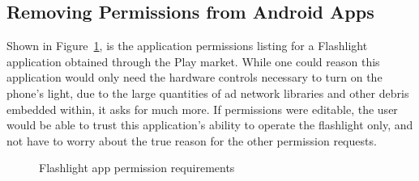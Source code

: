 \subsection{Removing Permissions from Android Apps}

Shown in Figure~\ref{fig:permission}, is the application permissions listing for a Flashlight application obtained through the Play market.  While one could reason this application would only need the hardware controls necessary to turn on the phone's light, due to the large quantities of ad network libraries and other debris embedded within, it asks for much more. If permissions were editable, the user would be able to trust this application’s ability to operate the flashlight only, and not have to worry about the true reason for the other permission requests.

\begin{figure}[t]
\centerline{}
\caption{Flashlight app permission requirements}
\label{fig:permission}
\end{figure}

